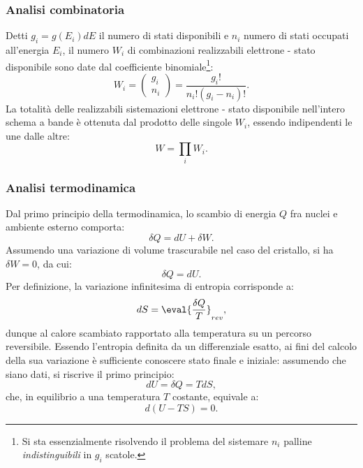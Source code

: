 \documentclass[a4paper,11pt]{report}
\begin{document}
\subsubsection{Analisi combinatoria}
Detti $g_i = g(E_i)dE$ il numero di stati disponibili e $n_i$ numero di stati occupati all'energia $E_i$, il numero $W_i$ di combinazioni realizzabili elettrone - stato disponibile sono date dal coefficiente binomiale\footnote{Si sta essenzialmente risolvendo il problema del sistemare $n_i$ palline \textit{indistinguibili} in $g_i$ scatole.}:  
\begin{equation}
W_i = 
    \begin{pmatrix}
    g_i \\
    n_i
    \end{pmatrix}
    = \frac{g_i!}{n_i!(g_i-n_i)!}.
\end{equation}
La totalità delle realizzabili sistemazioni elettrone - stato disponibile nell'intero schema a bande è ottenuta dal prodotto delle singole $W_i$, essendo indipendenti le une dalle altre: 
\begin{equation}
W = \prod_i W_i.
\end{equation}

\subsubsection{Analisi termodinamica}
Dal primo principio della termodinamica, lo scambio di energia $Q$ fra nuclei e ambiente esterno comporta:
\begin{equation}
\delta Q = dU + \delta W.
\end{equation}
Assumendo una variazione di volume trascurabile nel caso del cristallo, si ha $\delta W = 0$, da cui:
\begin{equation}
\delta Q = dU.
\end{equation}
Per definizione, la variazione infinitesima di entropia corrisponde a:
\begin{equation}
dS = \eval{\frac{\delta Q}{T}}_{rev},
\end{equation}
dunque al calore scambiato rapportato alla temperatura su un percorso reversibile. Essendo l'entropia definita da un differenziale esatto, ai fini del calcolo della sua variazione è sufficiente conoscere stato finale e iniziale: assumendo che siano dati, si riscrive il primo principio:
\begin{equation}
dU = \delta Q = TdS, 
\end{equation}
che, in equilibrio a una temperatura $T$ costante, equivale a:
\begin{equation}
d(U-TS) = 0.
\label{eq:prim_prin}
\end{equation}
\end{document}
